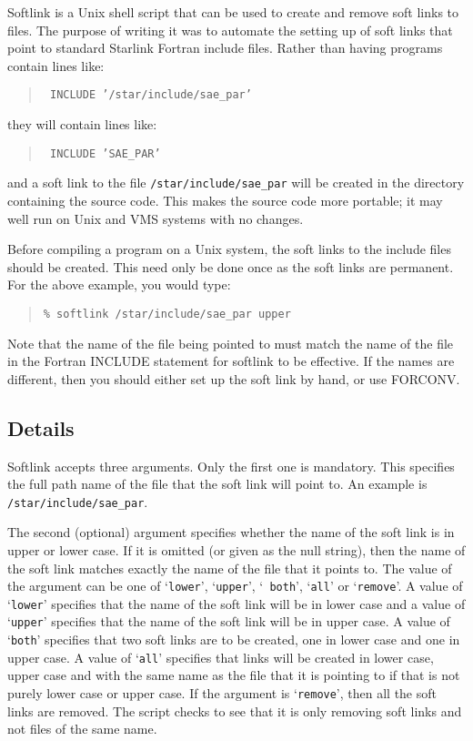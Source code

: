 Softlink is a Unix shell script that can be used to create and remove soft
links to files. The purpose of writing it was to automate the setting up of
soft links that point to standard Starlink Fortran include files.  Rather than
having programs contain lines like:

\begin{quote}{\tt
INCLUDE '/star/include/sae\_par'
}
\end{quote}

they will contain lines like:

\begin{quote}{\tt
INCLUDE 'SAE\_PAR'
}
\end{quote}

and a soft link to the file {\tt /star/include/sae\_par} will be created in the
directory containing the source code. This makes the source code more portable;
it may well run on Unix and VMS systems with no changes.

Before compiling a program on a Unix system, the soft links to the include
files should be created. This need only be done once as the soft links are
permanent. For the above example, you would type:

\begin{quote}
{\tt \% softlink /star/include/sae\_par upper}
\end{quote}

Note that the name of the file being pointed to must match the name of the file
in the Fortran INCLUDE statement for softlink to be effective. If the names are
different, then you should either set up the soft link by hand, or use FORCONV.

\subsection{Details}

Softlink accepts three arguments. Only the first one is mandatory. This
specifies the full path name of the file that the soft link will point to.
An example is {\tt /star/include/sae\_par}.

The second (optional) argument specifies whether the name of the soft link is
in upper or lower case. If it is omitted (or given as the null string), then
the name of the soft link matches exactly the name of the file that it points
to. The value of the argument can be one of `{\tt lower}', `{\tt upper}', `{\tt
both}', `{\tt all}' or `{\tt remove}'. A value of `{\tt lower}' specifies that
the name of the soft link will be in lower case and a value of `{\tt upper}'
specifies that the name of the soft link will be in upper case. A value of
`{\tt both}' specifies that two soft links are to be created, one in lower case
and one in upper case. A value of `{\tt all}' specifies that links will be
created in lower case, upper case and with the same name as the file that it is
pointing to if that is not purely lower case or upper case. If the argument is
`{\tt remove}', then all the soft links are removed. The script checks to see
that it is only removing soft links and not files of the same name.

